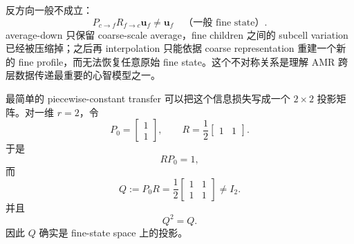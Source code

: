 反方向一般不成立：
\begin{equation}
\boxed{
P_{c\rightarrow f}R_{f\rightarrow c}\bm u_f
\neq\bm u_f
\quad\text{（一般 fine state）}.
}
\label{eq:amr-pr-not-identity}
\end{equation}
average-down 只保留 coarse-scale average，fine children 之间的 subcell variation 已经被压缩掉；之后再 interpolation 只能依据 coarse representation 重建一个新的 fine profile，而无法恢复任意原始 fine state。这个不对称关系是理解 AMR 跨层数据传递最重要的心智模型之一。


最简单的 piecewise-constant transfer 可以把这个信息损失写成一个 $2\times2$ 投影矩阵。对一维 $r=2$，令
\begin{equation}
P_0=
\begin{bmatrix}1\\1\end{bmatrix},
\qquad
R=\frac12
\begin{bmatrix}1&1\end{bmatrix}.
\end{equation}
于是
\begin{equation}
\boxed{
RP_0=1,
}
\label{eq:amr-rp-coarse-identity}
\end{equation}
而
\begin{equation}
\boxed{
Q:=P_0R
=
\frac12
\begin{bmatrix}
1&1\\
1&1
\end{bmatrix}
\neq I_2.
}
\label{eq:amr-simple-transfer-projector}
\end{equation}
并且
\begin{equation}
Q^2=Q.
\label{eq:amr-transfer-projector-idempotent}
\end{equation}
因此 $Q$ 确实是 fine-state space 上的投影。


